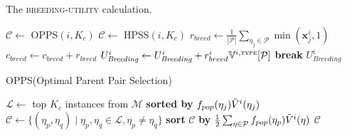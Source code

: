 \documentclass[conference]{IEEEtran}
\theoremstyle{plain}
\begin{document}
\begin{algorithm}[t!]
    \small
    \caption{The \textsc{breeding-utility} calculation.}
    \label{alg:breeding-utility}
    \begin{algorithmic}[1]
         $\mathcal{C}\gets$ OPPS\xspace$(i, K_c)$
    \EndIf
         $\mathcal{C}\gets$ HPSS\xspace$(i, K_c)$
    \EndIf
        \State $r_{breed}\gets \frac{1}{|\mathcal{P}|}\sum_{\eta_j\in \mathcal{P}} \min(\mathbf{x}^i_j, 1)$
        \State $c_{breed}\gets c_{breed}+r_{breed}$
        \State $U^i_\textit{Breeding}\gets U^i_\textit{Breeding} + r_{breed}^i\mathbb{V}^{i, \textsc{type}}[\mathcal{P}]$
            \textbf{break}
        \EndIf
    \EndFor
    \State\Return $U^i_\textit{Breeding}$
    \EndProcedure
    \end{algorithmic}
\end{algorithm}
\begin{algorithm}[t!]
    \small
    \caption{OPPS\xspace(Optimal Parent Pair Selection\xspace)}
    \label{alg:homos}
    \begin{algorithmic}[1]
    \Procedure{OPPS\xspace}{$i, K_c$}
    \State $\mathcal{L}\gets$ top $K_c$ instances from $\mathcal{M}$ \textbf{sorted by} $f_{pop}(\eta_j)\Tilde{V}^i(\eta_j)$
    \State $\mathcal{C}\gets \{(\eta_p, \eta_q) \mid \eta_p, \eta_q\in \mathcal{L},  \eta_p\neq \eta_q\}$
    \State \textbf{sort} $\mathcal{C}$ \textbf{by} $\frac{1}{2}\sum_{\eta\in\mathcal{P}}f_{pop}(\eta_p)\Tilde{V}^i(\eta)$
    \State \Return $\mathcal{C}$
    \EndProcedure
    \end{algorithmic}
\end{algorithm}
\end{document}
